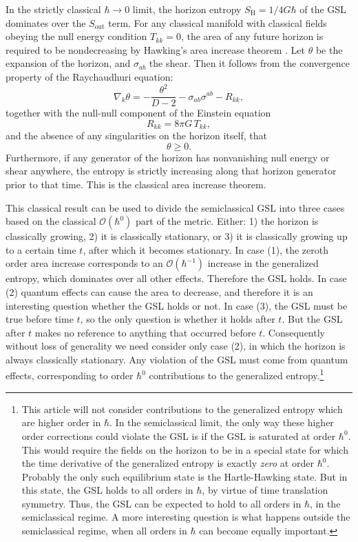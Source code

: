 \documentclass{article}
\begin{document}
In the strictly classical $\hbar \to 0$ limit, the horizon entropy $S_\mathrm{H} = 1/{4G \hbar}$ of the GSL dominates over the $S_\mathrm{out}$ term.  For any classical manifold with classical fields obeying the null energy condition $T_{kk} = 0$, the area of any future horizon is required to be nondecreasing by Hawking's area increase theorem \cite{hawking71}.  Let $\theta$ be the expansion of the horizon, and $\sigma_{ab}$ the shear.  Then it follows from the convergence property of the Raychaudhuri equation:
\begin{equation}
\nabla_k \theta = -\frac{\theta^2}{D-2} - \sigma_{ab}\sigma^{ab} - R_{kk},
\end{equation}
together with the null-null component of the Einstein equation
\begin{equation}
R_{kk} = 8\pi G\,T_{kk},
\end{equation}
and the absence of any singularities on the horizon itself, that
\begin{equation}
\theta \ge 0.
\end{equation}
Furthermore, if any generator of the horizon has nonvanishing null energy or shear anywhere, the entropy is strictly increasing along that horizon generator prior to that time.  This is the classical area increase theorem.

This classical result can be used to divide the semiclassical GSL into three cases based on the classical $\mathcal{O}(\hbar^0)$ part of the metric.  Either: 1) the horizon is classically growing, 2) it is classically stationary, or 3) it is classically growing up to a certain time $t$, after which it becomes stationary.  In case (1), the zeroth order area increase corresponds to an $\mathcal{O}(\hbar^{-1})$ increase in the generalized entropy, which dominates over all other effects.  Therefore the GSL holds.  In case (2) quantum effects can cause the area to decrease, and therefore it is an interesting question whether the GSL holds or not.  In case (3), the GSL must be true before time $t$, so the only question is whether it holds after $t$.  But the GSL after $t$ makes no reference to anything that occurred before $t$.  Consequently without loss of generality we need consider only case (2), in which the horizon is always classically stationary.  Any violation of the GSL must come from quantum effects, corresponding to order $\hbar^{0}$ contributions to the generalized entropy.\footnote{This article will not consider contributions to the generalized entropy which are higher order in $\hbar$.  In the semiclassical limit, the only way these higher order corrections could violate the GSL is if the GSL is saturated at order $\hbar^0$.  This would require the fields on the horizon to be in a special state for which the time derivative of the generalized entropy is exactly \emph{zero} at order $\hbar^0$.  Probably the only such equilibrium state is the Hartle-Hawking state.  But in this state, the GSL holds to all orders in $\hbar$, by virtue of time translation symmetry.  Thus, the GSL can be expected to hold to all orders in $\hbar$, in the semiclassical regime.  A more interesting question is what happens outside the semiclassical regime, when all orders in $\hbar$ can become equally important.}
\end{document}
